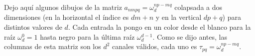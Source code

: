 Dejo aquí algunos dibujos de la matriz $a_{nmpq} = \omega_d^{np-mq}$ colapsada a dos dimensiones (en la horizontal el índice es $dm+n$ y en la vertical $dp+q$) para distintos valores de $d$. Cada entrada la pongo en un color desde el blanco para la raíz $\omega_d^0 = 1$ hasta negro para la última raíz $\omega_d^{d-1}$. Como se dijo antes, las columnas de esta matriz son los $d^2$ canales válidos, cada uno es $\tau_{pq} = \omega_d^{np-mq}$. 


\begin{figure}
    \centering
    \qquad
     \\%
\centering
    \qquad
    \\%

\end{figure}
